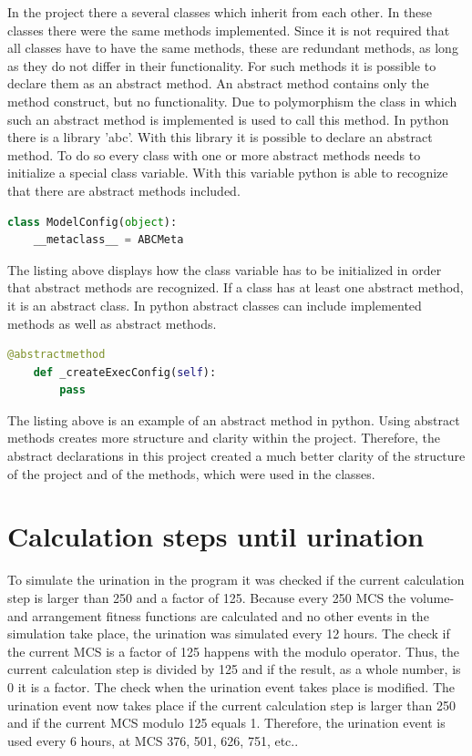 In the project there a several classes which inherit from each other. In these classes there were the same methods implemented. Since it is not required that all classes have to have the same methods, these are redundant methods, as long as they do not differ in their functionality. For such methods it is possible to declare them as an abstract method. An abstract method contains only the method construct, but no functionality. Due to polymorphism the class in which such an abstract method is implemented is used to call this method. \newline
In python there is a library 'abc'. With this library it is possible to declare an abstract method. To do so every class with one or more abstract methods needs to initialize a special class variable. With this variable python is able to recognize that there are abstract methods included.

\begin{lstlisting}[language=Python, caption = The initialization of a class variable which is required by python in order to detect abstract methods and abstract classes.]
class ModelConfig(object):
    __metaclass__ = ABCMeta
\end{lstlisting}

The listing above displays how the class variable has to be initialized in order that abstract methods are recognized. If a class has at least one abstract method, it is an abstract class. In python abstract classes can include implemented methods as well as abstract methods.

\begin{lstlisting}[language=Python, caption = Declaration of an abstract method.]
    @abstractmethod
    def _createExecConfig(self):
        pass
\end{lstlisting}

The listing above is an example of an abstract method in python. Using abstract methods creates more structure and clarity within the project. Therefore, the abstract declarations in this project created a much better clarity of the structure of the project and of the methods, which were used in the classes.

\section{Calculation steps until urination}
To simulate the urination in the program it was checked if the current calculation step is larger than 250 and a factor of 125. Because every 250 \ac{MCS} the volume- and arrangement fitness functions are calculated and no other events in the simulation take place, the urination was simulated every 12 hours. The check if the current \ac{MCS} is a factor of 125 happens with the modulo operator. Thus, the current calculation step is divided by 125 and if the result, as a whole number, is 0 it is a factor. \newline
The check when the urination event takes place is modified. The urination event now takes place if the current calculation step is larger than 250 and if the current \ac{MCS} modulo 125 equals 1. Therefore, the urination event is used every 6 hours, at \ac{MCS} 376, 501, 626, 751, etc..

